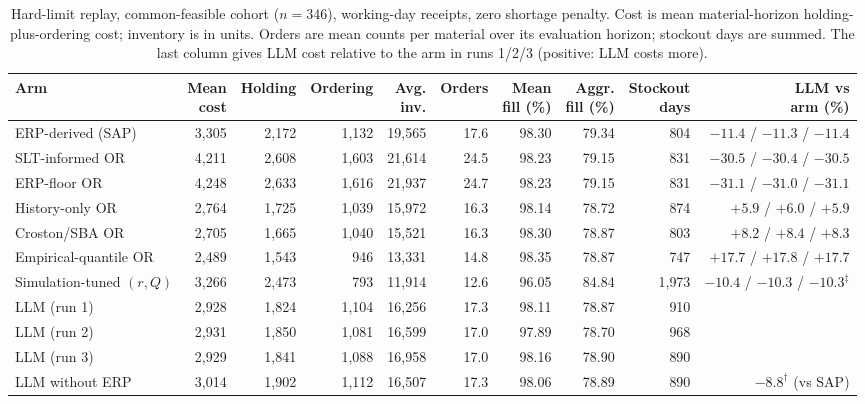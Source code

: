 \documentclass[preprint,12pt,nonatbib]{elsarticle}
\begin{document}
\begin{table}[htbp]
\centering
\caption{Hard-limit replay, common-feasible cohort ($n=346$), working-day receipts, zero shortage penalty. Cost is mean material-horizon holding-plus-ordering cost; inventory is in units. Orders are mean counts per material over its evaluation horizon; stockout days are summed. The last column gives LLM cost relative to the arm in runs 1/2/3 (positive: LLM costs more).}
\label{tab:backtest-results}
\scriptsize
\setlength{\tabcolsep}{3pt}
\begin{adjustbox}{max width=\textwidth}
\begin{tabular}{l r r r r r r r r r}
\hline
\textbf{Arm} & \shortstack{\textbf{Mean}\\\textbf{cost}} & \textbf{Holding} & \textbf{Ordering} & \shortstack{\textbf{Avg.}\\\textbf{inv.}} & \textbf{Orders} & \shortstack{\textbf{Mean}\\\textbf{fill (\%)}} & \shortstack{\textbf{Aggr.}\\\textbf{fill (\%)}} & \shortstack{\textbf{Stockout}\\\textbf{days}} & \shortstack{\textbf{LLM vs}\\\textbf{arm (\%)}} \\
\hline
ERP-derived (SAP) & 3{,}305 & 2{,}172 & 1{,}132 & 19{,}565 & 17.6 & 98.30 & 79.34 & 804 & $-11.4$ / $-11.3$ / $-11.4$ \\
SLT-informed OR & 4{,}211 & 2{,}608 & 1{,}603 & 21{,}614 & 24.5 & 98.23 & 79.15 & 831 & $-30.5$ / $-30.4$ / $-30.5$ \\
ERP-floor OR & 4{,}248 & 2{,}633 & 1{,}616 & 21{,}937 & 24.7 & 98.23 & 79.15 & 831 & $-31.1$ / $-31.0$ / $-31.1$ \\
History-only OR & 2{,}764 & 1{,}725 & 1{,}039 & 15{,}972 & 16.3 & 98.14 & 78.72 & 874 & $+5.9$ / $+6.0$ / $+5.9$ \\
Croston/SBA OR & 2{,}705 & 1{,}665 & 1{,}040 & 15{,}521 & 16.3 & 98.30 & 78.87 & 803 & $+8.2$ / $+8.4$ / $+8.3$ \\
Empirical-quantile OR & 2{,}489 & 1{,}543 & 946 & 13{,}331 & 14.8 & 98.35 & 78.87 & 747 & $+17.7$ / $+17.8$ / $+17.7$ \\
Simulation-tuned $(r,Q)$ & 3{,}266 & 2{,}473 & 793 & 11{,}914 & 12.6 & 96.05 & 84.84 & 1{,}973 & $-10.4$ / $-10.3$ / $-10.3^{\ddagger}$ \\
\hline
LLM (run 1) & 2{,}928 & 1{,}824 & 1{,}104 & 16{,}256 & 17.3 & 98.11 & 78.87 & 910 & \\
LLM (run 2) & 2{,}931 & 1{,}850 & 1{,}081 & 16{,}599 & 17.0 & 97.89 & 78.70 & 968 & \\
LLM (run 3) & 2{,}929 & 1{,}841 & 1{,}088 & 16{,}958 & 17.0 & 98.16 & 78.90 & 890 & \\
LLM without ERP & 3{,}014 & 1{,}902 & 1{,}112 & 16{,}507 & 17.3 & 98.06 & 78.89 & 890 & $-8.8^{\dagger}$ (vs SAP) \\
\hline
\end{tabular}
\end{adjustbox}


\end{table}
\end{document}
